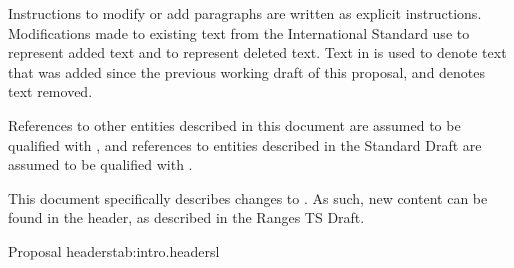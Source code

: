 \pnum
Instructions to modify or add paragraphs are written as explicit instructions.
Modifications made to existing text from the International Standard use
 to represent added text and  to
represent deleted text. Text in  is used to denote text that
was added since the previous working draft of this proposal, and 
denotes text removed.

\pnum
References to other entities described in this document are assumed to be
qualified with , and references to entities
described in the \Cpp Standard Draft are assumed to be qualified with .

\pnum
This document specifically describes changes to . As such, new content can be found
in the  header, as described in the Ranges TS Draft.

\begin{floattable}{Proposal headers}{tab:intro.headers}{l}
\topline
{}\\
\bottomline
\end{floattable}
